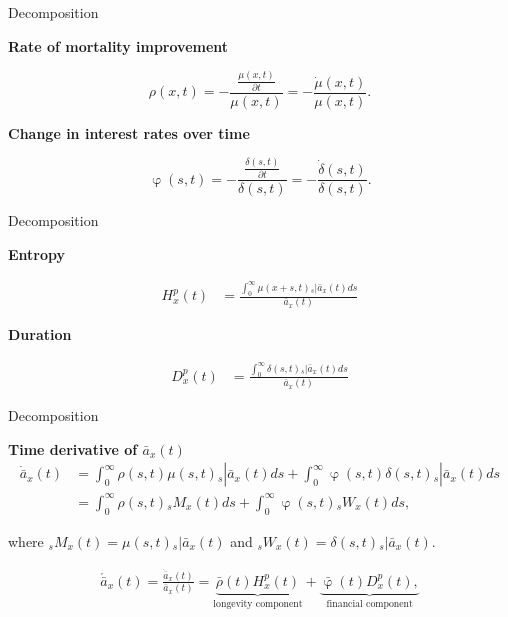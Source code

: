 \documentclass[10pt]{beamer}
\begin{document}
\begin{frame}{Decomposition}

\textbf{Rate of mortality improvement}

\begin{equation} \label{eq:rho}
\rho(x,t)=-\frac{\frac{\mu(x,t)}{\partial t}}{\mu(x,t)} = - \frac{\dot{\mu}(x,t)}{\mu(x,t)}.
\end{equation}

\textbf{Change in interest rates over time}

\begin{equation} \label{eq:phi}
\upvarphi(s,t)=-\frac{\frac{\delta(s,t)}{\partial t}}{\delta(s,t)} = -\frac{\dot{\delta}(s,t)}{\delta(s,t)}.
\end{equation}

\end{frame}

\begin{frame}{Decomposition}



\textbf{Entropy}

\begin{equation} \label{eq:EntropyP2}
\begin{split}
{H}^{p}_{x}(t) &=  \frac{\int_0^\infty \mu(x+s,t)   {}_s|\bar{a}_x(t) ds}{\bar{a}_x(t)} 
\end{split}
\end{equation}

\textbf{Duration}

\begin{equation}\label{eq:DurationP2}
\begin{split}
{D}^{p}_{x}(t) &= \frac{\int_0^\infty \delta(s,t) {}_s|\bar{a}_x(t)ds} {\bar{a}_x(t)} 
\end{split}
\end{equation}

\end{frame}

\begin{frame}{Decomposition}

\textbf{Time derivative of $\bar{a}_{x}(t)$ }
\begin{equation}\label{eq:TimeDerivP3}
\begin{split}
\dot{\bar{a}}_{x}(t) &=  \int_0^\infty \rho(s,t) \mu(s,t){}_s|\bar{a}_x(t) ds +\int_0^\infty  \upvarphi(s,t) \delta(s,t)  {}_s|\bar{a}_x(t) ds\\
&= \int_0^\infty \rho(s,t) {}_sM_x(t)  ds +\int_0^\infty  \upvarphi(s,t) {}_sW_x(t)  ds,
\end{split}
\end{equation}


where ${}_sM_x(t)= \mu(s,t){}_s|\bar{a}_x(t)$ and ${}_sW_x(t)=\delta(s,t)  {}_s|\bar{a}_x(t)$.

\begin{equation}\label{eq:TimeDerivP}
\begin{split}
\acute{\bar{a}}_x(t) = \frac{\dot{\bar{a}}_x(t)}{\bar{a}_x(t)}  = 
\underbrace{\bar{\rho}(t){H}^{p}_x(t)}_\text{longevity component}
+\underbrace{\bar{\upvarphi}(t){D}^{p}_x(t),}_\text{financial component}
\end{split}
\end{equation}
\end{frame}
\end{document}
